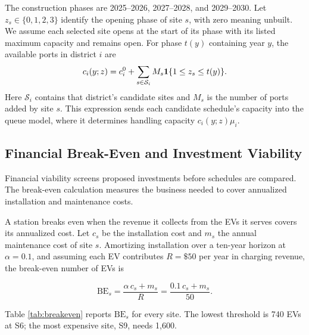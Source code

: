 \documentclass[12pt]{article}
\begin{document}
The construction phases are 2025--2026, 2027--2028, and 2029--2030. Let $z_s\in\{0,1,2,3\}$
identify the opening phase of site $s$, with zero meaning unbuilt. We assume each selected
site opens at the start of its phase with its listed maximum capacity and remains open.
For phase $t(y)$ containing year $y$, the available ports in district $i$ are
\begin{equation}
c_i(y;z)=c_i^0+\sum_{s\in\mathcal S_i}M_s\mathbf 1\{1\le z_s\le t(y)\}.
\label{eq:capacity}
\end{equation}
Here $\mathcal S_i$ contains that district's candidate sites and $M_s$ is the number of
ports added by site $s$. This expression sends each candidate schedule's capacity
into the queue model, where it determines handling capacity $c_i(y;z)\mu_i$.

\subsection{Financial Break-Even and Investment Viability}
\label{subsec:break-even}\label{sec:expansion}\label{sec:finance-link}
Financial viability screens proposed investments before schedules are compared.
The break-even calculation measures the business needed to cover annualized installation
and maintenance costs.

A station breaks even when the revenue it collects from the EVs it serves covers its
annualized cost. Let $c_s$ be the installation cost and $m_s$ the annual maintenance cost
of site $s$. Amortizing installation over a ten-year horizon at $\alpha=0.1$, and assuming
each EV contributes $R=\$50$ per year in charging revenue, the break-even number of EVs is

\begin{equation}
\mathrm{BE}_s = \frac{\alpha\, c_s + m_s}{R} = \frac{0.1\, c_s + m_s}{50}.
\end{equation}

Table \ref{tab:breakeven} reports $\mathrm{BE}_s$ for every site. The lowest threshold is 740 EVs at S6; the most expensive site, S9, needs 1,600.
\end{document}
